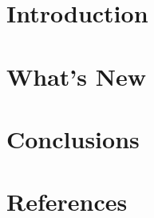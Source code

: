 \section[Intro]{Introduction}


\section[New]{What's New}


% 

\section[Concl]{Conclusions}


\section[Refs]{References}

